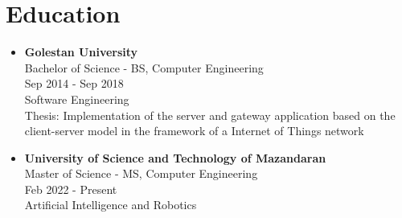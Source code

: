 \section*{\LARGE{Education}}
\begin{itemize}
    \item \large{\textbf{Golestan University}\\}\normalsize{Bachelor of Science - BS, Computer Engineering\\Sep 2014 - Sep 2018\\Software Engineering\\Thesis: Implementation of the server and gateway application based on the client-server model in the framework of a Internet of Things network}
    \item \large{\textbf{University of Science and Technology of Mazandaran}\\}\normalsize{Master of Science - MS, Computer Engineering\\Feb 2022 - Present\\Artificial Intelligence and Robotics}
\end{itemize}